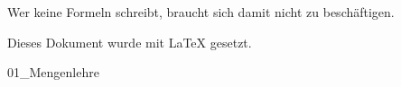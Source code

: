\documentclass{formulaCollection}
\begin{document}
\maketitle
\thispagestyle{empty}


\vfill
 



\begin{center}
Wer keine Formeln schreibt, braucht sich damit nicht zu beschäftigen.
\end{center}







\pagebreak



\setcounter{tocdepth}{1}
\tableofcontents
\thispagestyle{empty}


\vfill

\begin{center}
\small{Dieses Dokument wurde mit \LaTeX{} gesetzt.}
\end{center}

\newpage

\clearpage
{} 

%
{01_Mengenlehre}

\pagebreak


\pagebreak








\end{document}
